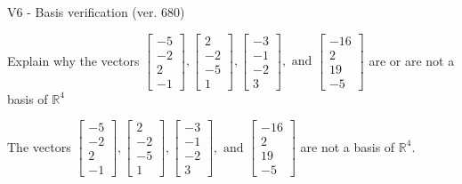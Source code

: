 \begin{exercise}
  \begin{exerciseTitle}V6 - Basis verification (ver. 680)\end{exerciseTitle}
  \begin{exerciseStatement}
    Explain why the vectors \(\left[\begin{array}{r}
-5 \\
-2 \\
2 \\
-1
\end{array}\right] , \left[\begin{array}{r}
2 \\
-2 \\
-5 \\
1
\end{array}\right] , \left[\begin{array}{r}
-3 \\
-1 \\
-2 \\
3
\end{array}\right] , \text{ and } \left[\begin{array}{r}
-16 \\
2 \\
19 \\
-5
\end{array}\right]\) are or are not a basis of \(\mathbb{R}^4\)	


  \end{exerciseStatement}
  \begin{exerciseAnswer}
   The vectors \(\left[\begin{array}{r}
-5 \\
-2 \\
2 \\
-1
\end{array}\right] , \left[\begin{array}{r}
2 \\
-2 \\
-5 \\
1
\end{array}\right] , \left[\begin{array}{r}
-3 \\
-1 \\
-2 \\
3
\end{array}\right] , \text{ and } \left[\begin{array}{r}
-16 \\
2 \\
19 \\
-5
\end{array}\right]\) 
  	 are not  a basis of \(\mathbb{R}^4\).
  


  \end{exerciseAnswer}
\end{exercise}